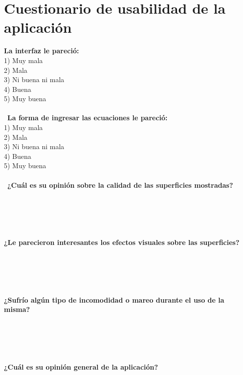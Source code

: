 \documentclass[12pt]{article}
\begin{document}
\section{Cuestionario de usabilidad de la aplicación}
\textbf{La interfaz le pareció:}
\\ 1) Muy mala
\\ 2) Mala
\\ 3) Ni buena ni mala
\\ 4) Buena
\\ 5) Muy buena
\\\\\
\textbf{La forma de ingresar las ecuaciones le pareció:}
\\ 1) Muy mala
\\ 2) Mala
\\ 3) Ni buena ni mala
\\ 4) Buena
\\ 5) Muy buena
\\\\\
\textbf{¿Cuál es su opinión sobre la calidad de las superficies mostradas?}
\\\\\\\\\\\\
\textbf{¿Le parecieron interesantes los efectos visuales sobre las superficies?}
\\\\\\\\\\\\
\textbf{¿Sufrío algún tipo de incomodidad o mareo durante el uso de la misma?}
\\\\\\\\\\\\
\textbf{¿Cuál es su opinión general de la aplicación?}
\clearpage
\end{document}
